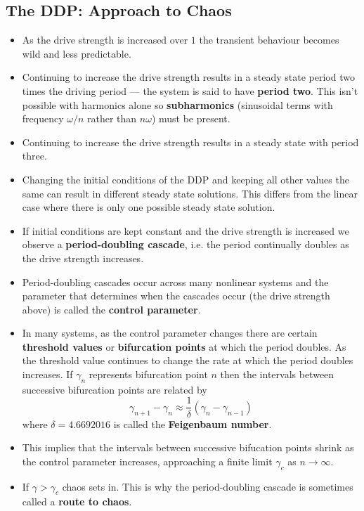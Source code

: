 \documentclass{article}
\begin{document}
\subsection{The DDP: Approach to Chaos}

\begin{itemize}
  \item As the drive strength is increased over $1$ the transient behaviour becomes wild and less predictable.

  \item Continuing to increase the drive strength results in a steady state period two times the driving period — the system is said to have \textbf{period two}. This isn't possible with harmonics alone so \textbf{subharmonics} (sinusoidal terms with frequency $\omega / n$ rather than $n \omega$) must be present.

  \item Continuing to increase the drive strength results in a steady state with period three.

  \item Changing the initial conditions of the DDP and keeping all other values the same can result in different steady state solutions. This differs from the linear case where there is only one possible steady state solution.

  \item If initial conditions are kept constant and the drive strength is increased we observe a \textbf{period-doubling cascade}, i.e. the period continually doubles as the drive strength increases.

  \item Period-doubling cascades occur across many nonlinear systems and the parameter that determines when the cascades occur (the drive strength above) is called the \textbf{control parameter}.

  \item In many systems, as the control parameter changes there are certain \textbf{threshold values} or \textbf{bifurcation points} at which the period doubles. As the threshold value continues to change the rate at which the period doubles increases. If $\gamma_n$ represents bifurcation point $n$ then the intervals between successive bifurcation points are related by \[\gamma_{n + 1} - \gamma_n \approx \frac{1}{\delta} (\gamma_n - \gamma_{n - 1})\] where $\delta = \num{4.6692016}$ is called the \textbf{Feigenbaum number}.

  \item This implies that the intervals between successive bifucation points shrink as the control parameter increases, approaching a finite limit $\gamma_c$ as $n \rightarrow \infty$.

  \item If $\gamma > \gamma_c$ chaos sets in. This is why the period-doubling cascade is sometimes called a \textbf{route to chaos}.
\end{itemize}
\end{document}
